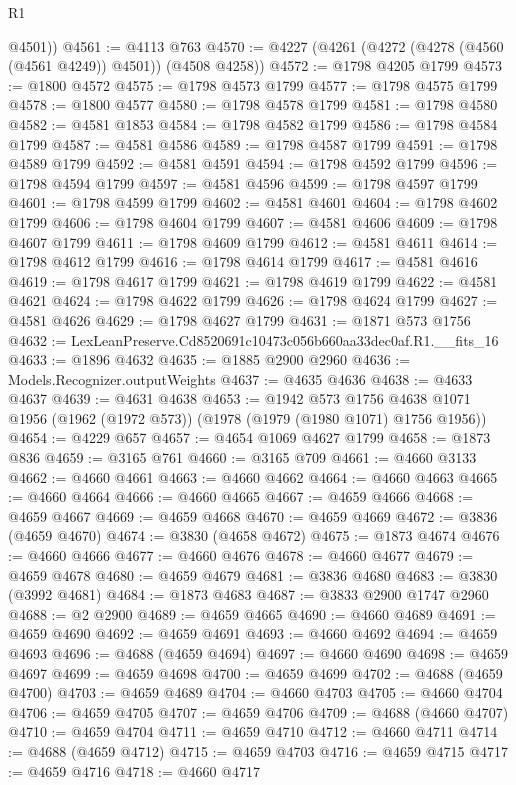 \begin{lexlean}{R1}
\begin{coremodule}
        @4501))
@4561 := @4113 @763
@4570 := @4227 (@4261 (@4272 (@4278 (@4560 (@4561 @4249)) @4501)) (@4508 @4258))
@4572 := @1798 @4205 @1799
@4573 := @1800 @4572
@4575 := @1798 @4573 @1799
@4577 := @1798 @4575 @1799
@4578 := @1800 @4577
@4580 := @1798 @4578 @1799
@4581 := @1798 @4580
@4582 := @4581 @1853
@4584 := @1798 @4582 @1799
@4586 := @1798 @4584 @1799
@4587 := @4581 @4586
@4589 := @1798 @4587 @1799
@4591 := @1798 @4589 @1799
@4592 := @4581 @4591
@4594 := @1798 @4592 @1799
@4596 := @1798 @4594 @1799
@4597 := @4581 @4596
@4599 := @1798 @4597 @1799
@4601 := @1798 @4599 @1799
@4602 := @4581 @4601
@4604 := @1798 @4602 @1799
@4606 := @1798 @4604 @1799
@4607 := @4581 @4606
@4609 := @1798 @4607 @1799
@4611 := @1798 @4609 @1799
@4612 := @4581 @4611
@4614 := @1798 @4612 @1799
@4616 := @1798 @4614 @1799
@4617 := @4581 @4616
@4619 := @1798 @4617 @1799
@4621 := @1798 @4619 @1799
@4622 := @4581 @4621
@4624 := @1798 @4622 @1799
@4626 := @1798 @4624 @1799
@4627 := @4581 @4626
@4629 := @1798 @4627 @1799
@4631 := @1871 @573 @1756
@4632 := LexLeanPreserve.Cd8520691c10473c056b660aa33dec0af.R1.__fits_16
@4633 := @1896 @4632
@4635 := @1885 @2900 @2960
@4636 := Models.Recognizer.outputWeights
@4637 := @4635 @4636
@4638 := @4633 @4637
@4639 := @4631 @4638
@4653 := @1942
    @573
    @1756
    @4638
    @1071
    @1956
    (@1962 (@1972 @573))
    (@1978 (@1979 (@1980 @1071) @1756 @1956))
@4654 := @4229 @657
@4657 := @4654 @1069 @4627 @1799
@4658 := @1873 @836
@4659 := @3165 @761
@4660 := @3165 @709
@4661 := @4660 @3133
@4662 := @4660 @4661
@4663 := @4660 @4662
@4664 := @4660 @4663
@4665 := @4660 @4664
@4666 := @4660 @4665
@4667 := @4659 @4666
@4668 := @4659 @4667
@4669 := @4659 @4668
@4670 := @4659 @4669
@4672 := @3836 (@4659 @4670)
@4674 := @3830 (@4658 @4672)
@4675 := @1873 @4674
@4676 := @4660 @4666
@4677 := @4660 @4676
@4678 := @4660 @4677
@4679 := @4659 @4678
@4680 := @4659 @4679
@4681 := @3836 @4680
@4683 := @3830 (@3992 @4681)
@4684 := @1873 @4683
@4687 := @3833 @2900 @1747 @2960
@4688 := @2 @2900
@4689 := @4659 @4665
@4690 := @4660 @4689
@4691 := @4659 @4690
@4692 := @4659 @4691
@4693 := @4660 @4692
@4694 := @4659 @4693
@4696 := @4688 (@4659 @4694)
@4697 := @4660 @4690
@4698 := @4659 @4697
@4699 := @4659 @4698
@4700 := @4659 @4699
@4702 := @4688 (@4659 @4700)
@4703 := @4659 @4689
@4704 := @4660 @4703
@4705 := @4660 @4704
@4706 := @4659 @4705
@4707 := @4659 @4706
@4709 := @4688 (@4660 @4707)
@4710 := @4659 @4704
@4711 := @4659 @4710
@4712 := @4660 @4711
@4714 := @4688 (@4659 @4712)
@4715 := @4659 @4703
@4716 := @4659 @4715
@4717 := @4659 @4716
@4718 := @4660 @4717

\end{coremodule}
\end{lexlean}
